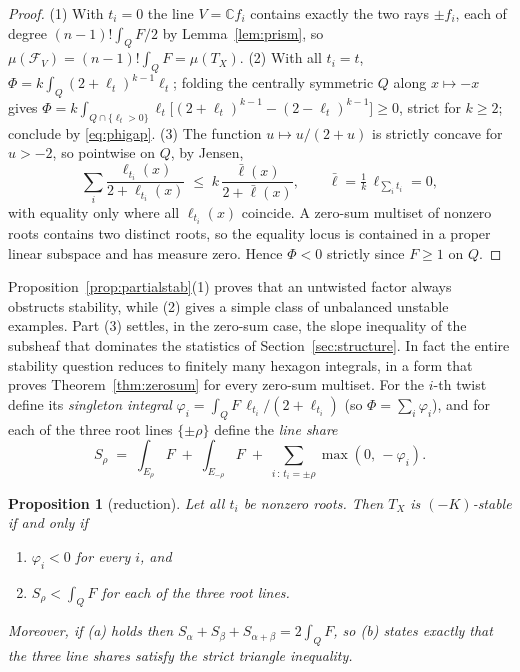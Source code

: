 \documentclass[11pt]{amsart}
\newtheorem{proposition}[theorem]{Proposition}
\theoremstyle{definition}
\theoremstyle{remark}
\newcommand{\CC}{\mathbb{C}}
\begin{document}
\begin{proof}
(1) With $t_i = 0$ the line $V = \CC f_i$ contains exactly the two rays
$\pm f_i$, each of degree $(n-1)! \int_Q F/2$ by Lemma~\ref{lem:prism}, so
$\mu(\mathcal{F}_V) = (n-1)! \int_Q F = \mu(T_X)$.
(2) With all $t_i = t$, $\Phi = k \int_Q (2+\ell_t)^{k-1} \ell_t$; folding
the centrally symmetric $Q$ along $x \mapsto -x$ gives
$\Phi = k \int_{Q \cap \{\ell_t > 0\}} \ell_t \bigl[(2+\ell_t)^{k-1} -
(2-\ell_t)^{k-1}\bigr] \ge 0$, strict for $k \ge 2$; conclude by
\eqref{eq:phigap}.
(3) The function $u \mapsto u/(2+u)$ is strictly concave for $u > -2$, so
pointwise on $Q$, by Jensen,
\[
\sum_i \frac{\ell_{t_i}(x)}{2 + \ell_{t_i}(x)} \;\le\;
k \, \frac{\bar\ell(x)}{2 + \bar\ell(x)}, \qquad
\bar\ell = \tfrac{1}{k} \, \ell_{\sum_i t_i} = 0,
\]
with equality only where all $\ell_{t_i}(x)$ coincide. A zero-sum multiset
of nonzero roots contains two distinct roots, so the equality locus is
contained in a proper linear subspace and has measure zero. Hence
$\Phi < 0$ strictly since $F \ge 1$ on $Q$.
\end{proof}

Proposition~\ref{prop:partialstab}(1) proves that an untwisted factor always
obstructs stability, while (2) gives a simple class of unbalanced unstable
examples. Part (3) settles, in the zero-sum case, the
slope inequality of the subsheaf that dominates the statistics of
Section~\ref{sec:structure}. In fact the entire stability question reduces
to finitely many hexagon integrals, in a form that proves
Theorem~\ref{thm:zerosum} for every zero-sum multiset. For the $i$-th twist
define its \emph{singleton integral}
$\varphi_i = \int_Q F\, \ell_{t_i}/(2 + \ell_{t_i})$ (so
$\Phi = \sum_i \varphi_i$), and for each of the three root lines
$\{\pm\rho\}$ define the \emph{line share}
\[
S_\rho \;=\; \int_{E_\rho} F \;+\; \int_{E_{-\rho}} F
\;+\; \sum_{i \,:\, t_i = \pm\rho} \max(0,\, -\varphi_i).
\]

\begin{proposition}[reduction]\label{prop:reduction}
Let all $t_i$ be nonzero roots. Then $T_X$
is $(-K)$-stable if and only if
\begin{enumerate}
\item[(a)] $\varphi_i < 0$ for every $i$, and
\item[(b)] $S_\rho < \int_Q F$ for each of the three root lines.
\end{enumerate}
Moreover, if (a) holds then $S_\alpha + S_\beta + S_{\alpha+\beta} =
2\int_Q F$, so (b) states exactly that the three line shares satisfy the
strict triangle inequality.
\end{proposition}
\end{document}
